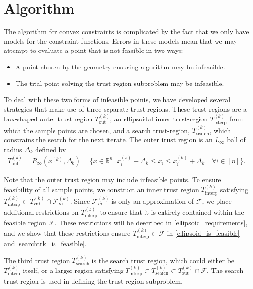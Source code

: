\documentclass{article}
\theoremstyle{case}
\numberwithin{theorem}{subsection}
\newcommand{\dk}{\Delta_k}
\newcommand{\feasiblek}{{\mathcal F_m^{(k)}}}
\newcommand{\feasible}{{\mathcal F}}
\newcommand{\outertrk}{{T_{\text{out}}^{(k)}}}
\newcommand{\Rn}{\mathbb R^n}
\newcommand{\sampletrk}{{T_{\text{interp}}^{(k)}}}
\newcommand{\searchtrk}{{T_{\text{search}}^{(k)}}}
\newcommand{\tr}{{ B_{\infty}\left(\xk, \dk\right) }}
\newcommand{\xk}{x^{(k)}}
\begin{document}
\section{Algorithm}
\label{infeasible_point_strategies}


The algorithm for convex constraints is complicated by the fact that we only have models for the constraint functions.
Errors in these models mean that we may attempt to evaluate a point that is not feasible in two ways:
\begin{itemize}
\item A point chosen by the geometry ensuring algorithm may be infeasible.
\item The trial point solving the trust region subproblem may be infeasible.
\end{itemize}


To deal with these two forms of infeasible points, we have developed several strategies that make use of three separate trust regions.
These trust regions are a box-shaped outer trust region $\outertrk$,  an ellipsoidal inner trust-region $\sampletrk$ from which the sample points are chosen,  and a search trust-region, $\searchtrk$, which constrains the search for the next iterate.
The outer trust region is an $L_{\infty}$ ball of radius $ \dk $ defined by
\begin{align}
\outertrk = \tr = \{x\in \Rn | \; \xk_i - \dk \le x_i \le \xk_i + \dk \quad \forall i \in [n]\}. \label{define_outer_trust_region}
\end{align}

Note that the outer trust region may include infeasible points.
To ensure feasibility of all sample points, we construct an inner trust region  $ \sampletrk $  satisfying 
$\sampletrk \subset \outertrk \cap \feasiblek$.
Since $\feasiblek$ is only an approximation of $\feasible$,  we place additional restrictions on $\sampletrk$
to ensure that it is entirely contained within the feasible region $\feasible$.
These restrictions will be described in \cref{ellipsoid_requirements}, 
and we show that these restrictions ensure $\sampletrk \subset \feasible$ in \cref{ellipsoid_is_feasible} and \cref{searchtrk_is_feasible}.


The third trust region $\searchtrk$ is the search trust region, which could either be $\sampletrk$ itself, 
or a larger region satisfying $ \sampletrk \subset \searchtrk \subset \outertrk \cap \feasible$.
The search trust region is used in defining the trust region subproblem.
\end{document}

